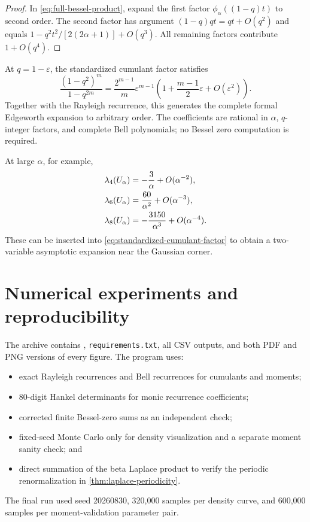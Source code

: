 \documentclass[11pt]{article}
\theoremstyle{definition}
\theoremstyle{remark}
\begin{document}
\begin{proof}
In \eqref{eq:full-bessel-product}, expand the first factor
\(\phi_\alpha((1-q)t)\) to second order.  The second factor has argument
\((1-q)qt=qt+O(q^2)\) and equals
\(1-q^2t^2/[2(2\alpha+1)]+O(q^3)\).  All remaining factors contribute
\(1+O(q^4)\).
\end{proof}

At \(q=1-\varepsilon\), the standardized cumulant factor satisfies
\begin{equation}
 \frac{(1-q^2)^m}{1-q^{2m}}
 =\frac{2^{m-1}}m\varepsilon^{m-1}
 \left(1+\frac{m-1}{2}\varepsilon+O(\varepsilon^2)\right).
 \label{eq:q1-cumulant-expansion}
\end{equation}
Together with the Rayleigh recurrence, this generates the complete formal
Edgeworth expansion to arbitrary order.  The coefficients are rational in
\(\alpha\), \(q\)-integer factors, and complete Bell polynomials; no Bessel
zero computation is required.

At large \(\alpha\), for example,
\begin{align}
 \lambda_4(U_\alpha)&=-\frac3\alpha+O(\alpha^{-2}),\notag\\
 \lambda_6(U_\alpha)&=\frac{60}{\alpha^2}+O(\alpha^{-3}),\notag\\
 \lambda_8(U_\alpha)&=-\frac{3150}{\alpha^3}+O(\alpha^{-4}).
 \label{eq:large-alpha-cumulants}
\end{align}
These can be inserted into \eqref{eq:standardized-cumulant-factor} to obtain a
two-variable asymptotic expansion near the Gaussian corner.

\section{Numerical experiments and reproducibility}
\label{sec:numerics}

The archive contains , \texttt{requirements.txt}, all
CSV outputs, and both PDF and PNG versions of every figure.  The program uses:
\begin{itemize}
 \item exact Rayleigh recurrences and Bell recurrences for cumulants and
       moments;
 \item 80-digit Hankel determinants for monic recurrence coefficients;
 \item corrected finite Bessel-zero sums as an independent check;
 \item fixed-seed Monte Carlo only for density visualization and a separate
       moment sanity check; and
 \item direct summation of the beta Laplace product to verify the periodic
       renormalization in \cref{thm:laplace-periodicity}.
\end{itemize}
The final run used seed 20260830, 320,000 samples per density curve, and
600,000 samples per moment-validation parameter pair.
\end{document}
